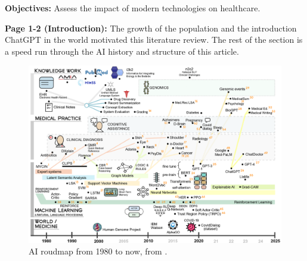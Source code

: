     \textbf{Objectives:}
    Assess the impact of modern technologies on healthcare.
    
    \textbf{Page 1-2 (Introduction):}
    The growth of the population and the introduction ChatGPT in the world motivated this literature review. The rest of the section is a speed run through the AI history and structure of this article.
    \begin{figure}[H]
        \centering
        \includegraphics[width=1\textwidth]{figures/0022_SR06US23/fig1.png}
        \caption{AI roudmap from 1980 to now, from \cite{x090}.}
        \label{fig1:0022_SR06US23}
    \end{figure}
    
